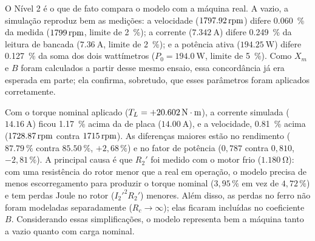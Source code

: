 O Nível 2 é o que de fato compara o modelo com a máquina real. A vazio, a simulação reproduz bem as medições: a velocidade ($\SI{1797,92}{\mathrm{rpm}}$) difere \SI{0,060}{\percent} da medida ($\SI{1799}{\mathrm{rpm}}$, limite de \SI{2}{\percent}); a corrente ($\SI{7,342}{\ampere}$) difere \SI{0,249}{\percent} da leitura de bancada ($\SI{7,36}{\ampere}$, limite de \SI{2}{\percent}); e a potência ativa ($\SI{194,25}{\watt}$) difere \SI{0,127}{\percent} da soma dos dois wattímetros ($P_0 = \SI{194,0}{\watt}$, limite de \SI{5}{\percent}). Como $X_m$ e $B$ foram calculados a partir desse mesmo ensaio, essa concordância já era esperada em parte; ela confirma, sobretudo, que esses parâmetros foram aplicados corretamente.

Com o torque nominal aplicado ($T_L = +\SI{20,602}{\mathrm{N\cdot m}}$), a corrente simulada ($\SI{14,16}{\ampere}$) ficou \SI{1,17}{\percent} acima da de placa ($\SI{14,00}{\ampere}$), e a velocidade, \SI{0,81}{\percent} acima ($\SI{1728,87}{\mathrm{rpm}}$ contra $\SI{1715}{\mathrm{rpm}}$). As diferenças maiores estão no rendimento ($\SI{87,79}{\percent}$ contra $\SI{85,50}{\percent}$, $+2{,}68\,\%$) e no fator de potência ($0{,}787$ contra $0{,}810$, $-2{,}81\,\%$). A principal causa é que $R_2'$ foi medido com o motor frio ($\SI{1,180}{\ohm}$): com uma resistência do rotor menor que a real em operação, o modelo precisa de menos escorregamento para produzir o torque nominal ($3{,}95\,\%$ em vez de $4{,}72\,\%$) e tem perdas Joule no rotor ($I_2'^2 R_2'$) menores. Além disso, as perdas no ferro não foram modeladas separadamente ($R_c \to \infty$); elas ficaram incluídas no coeficiente $B$. Considerando essas simplificações, o modelo representa bem a máquina tanto a vazio quanto com carga nominal.
